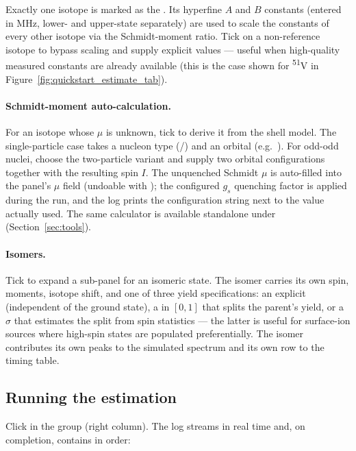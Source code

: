 Exactly one isotope is marked as the . Its hyperfine
$A$ and $B$ constants (entered in MHz, lower- and upper-state
separately) are used to scale the constants of every other isotope
via the Schmidt-moment ratio. Tick  on a
non-reference isotope to bypass scaling and supply explicit values ---
useful when high-quality measured constants are already available
(this is the case shown for \textsuperscript{51}V in
Figure~\ref{fig:quickstart_estimate_tab}).

\paragraph{Schmidt-moment auto-calculation.}
For an isotope whose $\mu$ is unknown, tick 
to derive it from the shell model. The single-particle case takes a
nucleon type (/) and an orbital (e.g.\ ).
For odd-odd nuclei, choose the two-particle variant and supply two
orbital configurations together with the resulting spin $I$. The
unquenched Schmidt $\mu$ is auto-filled into the panel's $\mu$ field
(undoable with ); the configured $g_s$ quenching factor
is applied during the run, and the log prints the configuration
string next to the value actually used. The same calculator is
available standalone under  (Section~\ref{sec:tools}).

\paragraph{Isomers.}
Tick  to expand a sub-panel for an isomeric state.
The isomer carries its own spin, moments, isotope shift, and one of
three yield specifications: an explicit  (independent of
the ground state), a  in $[0,1]$ that splits
the parent's yield, or a  $\sigma$ that
estimates the split from spin statistics --- the latter is useful for
surface-ion sources where high-spin states are populated
preferentially. The isomer contributes its own peaks to the simulated
spectrum and its own row to the timing table.

\subsection{Running the estimation}

Click  in the  group (right
column). The log streams in real time and, on completion, contains
in order:

